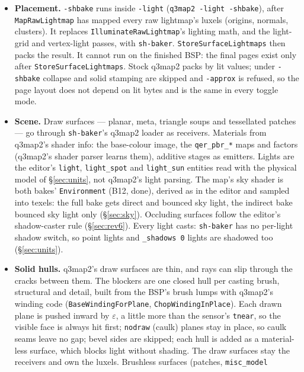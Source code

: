 \documentclass[11pt,a4paper]{article}
\begin{document}
\begin{itemize}
\item \textbf{Placement.} \texttt{-shbake} runs inside \texttt{-light}
  (\texttt{q3map2 -light -shbake}), after \texttt{MapRawLightmap} has mapped every raw lightmap's
  luxels (origins, normals, clusters). It replaces \texttt{IlluminateRawLightmap}'s lighting math,
  and the light-grid and vertex-light passes, with \texttt{sh-baker}. \texttt{StoreSurfaceLightmaps}
  then packs the result. It cannot run on the finished BSP: the final pages exist only after
  \texttt{StoreSurfaceLightmaps}. Stock q3map2 packs by lit values; under \texttt{-shbake} collapse
  and solid stamping are skipped and \texttt{-approx} is refused, so the page layout does not depend
  on lit bytes and is the same in every toggle mode.
\item \textbf{Scene.} Draw surfaces --- planar, meta, triangle soups and tessellated patches ---
  go through \texttt{sh-baker}'s q3map2 loader as receivers. Materials from q3map2's
  shader info: the base-colour image, the \texttt{qer\_pbr\_*} maps and factors (q3map2's shader
  parser learns them), additive stages as emitters. Lights are the editor's \texttt{light},
  \texttt{light\_spot} and \texttt{light\_sun} entities read with the physical model of
  §\ref{sec:units}, not q3map2's light parsing. The map's sky shader is both bakes'
  \texttt{Environment} (B12, done), derived as in the editor and sampled into texels: the full bake
  gets direct and bounced sky light, the indirect bake bounced sky light only (§\ref{sec:sky}). Occluding surfaces follow the editor's
  shadow-caster rule (§\ref{sec:rev6}). Every light casts: \texttt{sh-baker} has no per-light shadow
  switch, so point lights and \texttt{\_shadows 0} lights are shadowed too (§\ref{sec:units}).
\item \textbf{Solid hulls.} q3map2's draw surfaces are thin, and rays can slip through the cracks
  between them. The blockers are one closed hull per casting brush, structural and detail, built
  from the BSP's brush lumps with q3map2's winding code (\texttt{BaseWindingForPlane},
  \texttt{ChopWindingInPlace}). Each drawn plane is pushed inward by $\varepsilon$, a little more
  than the sensor's \texttt{tnear}, so the visible face is always hit first; \texttt{nodraw}
  (caulk) planes stay in place, so caulk seams leave no gap; bevel sides are skipped;
  each hull is added as a material-less surface, which blocks light without shading. The draw
  surfaces stay the receivers and own the luxels. Brushless surfaces (patches, \texttt{misc\_model}

\end{itemize}
\end{document}
